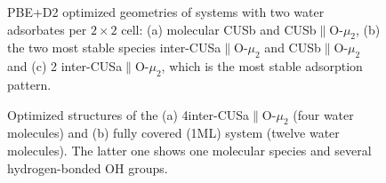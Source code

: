 \documentclass[11pt,DIV=13,BCOR=5mm,a4paper,headinclude]{scrbook}
\begin{document}
\begin{figure}[!ht]
 \centering
{}
 \quad\quad
  \quad
{}
 \quad
 \caption{PBE+D2 optimized geometries of systems with two water adsorbates per $2\times 2$ cell: (a) molecular CUSb and CUSb$\parallel$O-$\mu_2$, (b) the two most stable species inter-CUSa$\parallel$O-$\mu_2$ and CUSb$\parallel$O-$\mu_2$ and (c) 2 inter-CUSa$\parallel$O-$\mu_2$, which is the most stable adsorption pattern.}
        \label{abb:2water}
 \end{figure}
 \begin{figure}[!ht]
 \centering
{}
 \quad\quad
 \caption{Optimized structures of the (a) 4inter-CUSa$\parallel$O-$\mu_2$ (four water molecules) and (b) fully covered (1ML) system (twelve water molecules).
The latter one shows one molecular species and several hydrogen-bonded OH groups.}
        \label{abb:4+fully}
 \end{figure}
\end{document}

